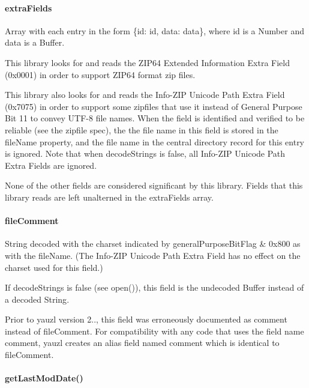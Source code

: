 \paragraph*{extra\+Fields}

{\ttfamily Array} with each entry in the form {\ttfamily \{id\+: id, data\+: data\}}, where {\ttfamily id} is a {\ttfamily Number} and {\ttfamily data} is a {\ttfamily Buffer}.

This library looks for and reads the Z\+I\+P64 Extended Information Extra Field (0x0001) in order to support Z\+I\+P64 format zip files.

This library also looks for and reads the Info-\/\+Z\+IP Unicode Path Extra Field (0x7075) in order to support some zipfiles that use it instead of General Purpose Bit 11 to convey {\ttfamily U\+T\+F-\/8} file names. When the field is identified and verified to be reliable (see the zipfile spec), the the file name in this field is stored in the {\ttfamily file\+Name} property, and the file name in the central directory record for this entry is ignored. Note that when {\ttfamily decode\+Strings} is false, all Info-\/\+Z\+IP Unicode Path Extra Fields are ignored.

None of the other fields are considered significant by this library. Fields that this library reads are left unalterned in the {\ttfamily extra\+Fields} array.

\paragraph*{file\+Comment}

{\ttfamily String} decoded with the charset indicated by {\ttfamily general\+Purpose\+Bit\+Flag \& 0x800} as with the {\ttfamily file\+Name}. (The Info-\/\+Z\+IP Unicode Path Extra Field has no effect on the charset used for this field.)

If {\ttfamily decode\+Strings} is {\ttfamily false} (see {\ttfamily open()}), this field is the undecoded {\ttfamily Buffer} instead of a decoded {\ttfamily String}.

Prior to yauzl version 2.., this field was erroneously documented as {\ttfamily comment} instead of {\ttfamily file\+Comment}. For compatibility with any code that uses the field name {\ttfamily comment}, yauzl creates an alias field named {\ttfamily comment} which is identical to {\ttfamily file\+Comment}.

\paragraph*{get\+Last\+Mod\+Date()}

